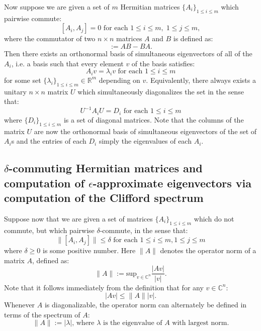 \documentclass[a4paper]{article}
\begin{document}
Now suppose we are given a set of $m$ Hermitian matrices $\{ A_i \}_{1 \leq i \leq m}$ which pairwise commute:
\begin{equation} \label{eq:pw_comm}
	[A_i,A_j] = 0 \text{ for each } 1 \leq i \leq m, \; 1 \leq j \leq m,
\end{equation}
where the commutator of two $n \times n$ matrices $A$ and $B$ is defined as:
\begin{equation}
	[ A, B ] := A B - B A.
\end{equation}
Then there exists \cite{HoffmanKunze} an orthonormal basis of {simultaneous eigenvectors} of all of the $A_i$, i.e. a basis such that every element $v$ of the basis satisfies:
\begin{equation}
	A_i v = \lambda_i v \text{ for each } 1 \leq i \leq m
\end{equation}
for some set $\{\lambda_i\}_{1 \leq i \leq m} \in \mathbb{R}^m$ depending on $v$. Equivalently, there always exists a unitary $n \times n$ matrix $U$ which {simultaneously diagonalizes} the set in the sense that:
\begin{equation}
	U^{-1} A_i U = D_i \text{ for each } 1 \leq i \leq m
\end{equation}
where $\{ D_i \}_{1 \leq i \leq m}$ is a set of diagonal matrices. Note that the columns of the matrix $U$ are now the orthonormal basis of simultaneous eigenvectors of the set of $A_i$s and the entries of each $D_i$ simply the eigenvalues of each $A_i$. 

\subsection{$\delta$-commuting Hermitian matrices and computation of $\epsilon$-approximate eigenvectors via computation of the Clifford spectrum} \label{sec:spec_app}

Suppose now that we are given a set of matrices $\{ A_i \}_{1 \leq i \leq m}$ which {do not commute}, but which {pairwise $\delta$-commute}, in the sense that: 
\begin{equation} \label{eq:alm_comm}
	\| [A_i,A_j] \| \leq \delta \text{ for each } 1 \leq i \leq m, 1 \leq j \leq m	
\end{equation}
where $\delta \geq 0$ is some positive number. Here $\| A \|$ denotes the {operator norm} of a matrix $A$, defined as:
\begin{equation}
	\| A \| := \text{sup}_{v \in \mathbb{C}^n} \frac{ | A v | }{ | v | }.
\end{equation}
Note that it follows immediately from the definition that for any $v \in \mathbb{C}^n$:
\begin{equation}
	| A v | \leq \| A \| | v |.
\end{equation}
Whenever $A$ is diagonalizable, the operator norm can alternately be defined in terms of the spectrum of $A$: 
\begin{equation}
	\| A \| := \text{$|\lambda|$, where $\lambda$ is the eigenvalue of $A$ with largest norm.}
\end{equation}
\end{document}
